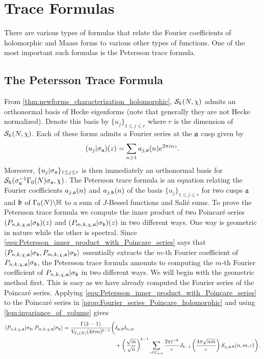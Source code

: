 \chapter{Trace Formulas}
  There are various types of formulas that relate the Fourier coefficients of holomorphic and Maass forms to various other types of functions. One of the most important such formulas is the Petersson trace formula.
  \section{The Petersson Trace Formula}
    From \cref{thm:newforms_characterization_holomorphic}, $\mathcal{S}_{k}(N,\chi)$ admits an orthonormal basis of Hecke eigenforms (note that generally they are not Hecke normalized). Denote this basis by $\{u_{j}\}_{1 \le j \le r}$ where $r$ is the dimension of $\mathcal{S}_{k}(N,\chi)$. Each of these forms admits a Fourier series at the $\mathfrak{a}$ cusp given by
    \[
      (u_{j}|\sigma_{\mathfrak{a}})(z) = \sum_{n \ge 1}a_{j,\mathfrak{a}}(n)e^{2\pi inz}.
    \]
    Moreover, $\{u_{j}|\sigma_{\mathfrak{a}}\}_{1 \le j \le r}$ is then immediately an orthonormal basis for $\mathcal{S}_{k}(\sigma_{\mathfrak{a}}^{-1}\Gamma_{0}(N)\sigma_{\mathfrak{a}},\chi)$.
    The Petersson trace formula is an equation relating the Fourier coefficients $a_{j,\mathfrak{a}}(n)$ and $a_{j,\mathfrak{b}}(n)$ of the basis $\{u_{j}\}_{1 \le j \le r}$ for two cusps $\mathfrak{a}$ and $\mathfrak{b}$ of $\Gamma_{0}(N)\backslash\mathbb{H}$ to a sum of $J$-Bessel functions and Sali\'e sums. To prove the Petersson trace formula we compute the inner product of two Poincar\'e series $(P_{n,k,\chi,\mathfrak{a}}|\sigma_{\mathfrak{b}})(z)$ and $(P_{m,k,\chi,\mathfrak{a}}|\sigma_{\mathfrak{b}})(z)$ in two different ways. One way is geometric in nature while the other is spectral. Since \cref{equ:Petersson_inner_product_with_Poincare_series} says that $\langle P_{n,k,\chi,\mathfrak{a}}|\sigma_{\mathfrak{b}},P_{m,k,\chi,\mathfrak{a}}|\sigma_{\mathfrak{b}}\rangle$ essentially extracts the $m$-th Fourier coefficient of $P_{n,k,\chi,\mathfrak{a}}|\sigma_{\mathfrak{b}}$, the Petersson trace formula amounts to computing the $m$-th Fourier coefficient of $P_{n,k,\chi,\mathfrak{a}}|\sigma_{\mathfrak{b}}$ in two different ways. We will begin with the geometric method first. This is easy as we have already computed the Fourier series of the Poincar\'e series. Applying \cref{equ:Petersson_inner_product_with_Poincare_series} to the Poincar\'e series in \cref{prop:Fourier_series_Poincare_holomorphic} and using \cref{lem:invariance_of_volume} gives
    \begin{align*}
      \langle P_{n,k,\chi,\mathfrak{a}}|\sigma_{\mathfrak{b}},P_{m,k,\chi,\mathfrak{a}}|\sigma_{\mathfrak{b}}\rangle = \frac{\Gamma(k-1)}{V_{\Gamma_{0}(N)}(4\pi m)^{k-1}}\bigg(&\delta_{\mathfrak{a},\mathfrak{b}}\delta_{n,m} \\
      &+\left(\frac{\sqrt{m}}{\sqrt{n}}\right)^{k-1}\sum_{c \in \mathcal{C}_{\mathfrak{a},\mathfrak{b}}}\frac{2\pi i^{-k}}{c}J_{k-1}\left(\frac{4\pi\sqrt{nm}}{c}\right)S_{\chi,\mathfrak{a},\mathfrak{b}}(n,m,c)\bigg).
    \end{align*}
